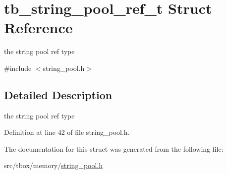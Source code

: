 \hypertarget{structtb__string__pool__ref__t}{\section{tb\-\_\-string\-\_\-pool\-\_\-ref\-\_\-t Struct Reference}
\label{structtb__string__pool__ref__t}
}


the string pool ref type  




{\ttfamily \#include $<$string\-\_\-pool.\-h$>$}



\subsection{Detailed Description}
the string pool ref type 

Definition at line 42 of file string\-\_\-pool.\-h.



The documentation for this struct was generated from the following file\-:\begin{DoxyCompactItemize}
\item 
src/tbox/memory/\hyperlink{string__pool_8h}{string\-\_\-pool.\-h}\end{DoxyCompactItemize}
